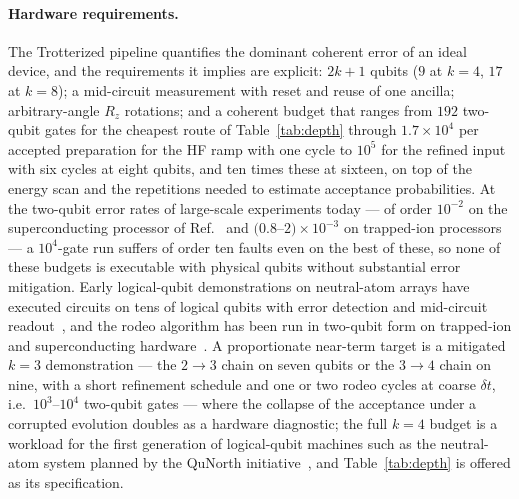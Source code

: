 \documentclass[
  aps,            %
  prc,            %
  reprint,        %
  superscriptaddress,
  floatfix,
  nofootinbib
]{revtex4-2}
\begin{document}
\paragraph{Hardware requirements.}
The Trotterized pipeline quantifies the dominant coherent error of an ideal
device, and the requirements it implies are explicit: $2k+1$ qubits ($9$ at
$k=4$, $17$ at $k=8$); a mid-circuit measurement with reset and reuse of one
ancilla; arbitrary-angle $R_z$ rotations; and a coherent budget that ranges
from $192$ two-qubit gates for the cheapest route of Table~\ref{tab:depth}
through $1.7\times10^{4}$ per accepted preparation for the HF ramp with one
cycle to $10^{5}$ for the refined input with six cycles at eight qubits,
and ten times these at sixteen, on top of the energy scan and the
repetitions needed to estimate acceptance probabilities.  At the two-qubit
error rates of large-scale experiments today --- of order $10^{-2}$ on the
superconducting processor of Ref.~\cite{Kim2023} and $(0.8$--$2)\times10^{-3}$
on trapped-ion processors~\cite{Moses2023,Ransford2025} --- a $10^{4}$-gate
run suffers of order ten faults even on the best of these, so none of
these budgets is executable with physical qubits without substantial error
mitigation.  Early logical-qubit demonstrations on neutral-atom arrays have
executed circuits on tens of logical qubits with error detection and
mid-circuit readout~\cite{Bluvstein2024,Reichardt2024}, and the rodeo
algorithm has been run in two-qubit form on trapped-ion and superconducting
hardware~\cite{BeeLindgren2022,Qian2024}.  A proportionate near-term target
is a mitigated $k=3$ demonstration --- the $2\to3$ chain on seven qubits or
the $3\to4$ chain on nine, with a short refinement schedule and one or two
rodeo cycles at coarse $\delta t$, i.e.\ $10^{3}$--$10^{4}$ two-qubit gates
--- where the collapse of the acceptance under a corrupted evolution doubles
as a hardware diagnostic; the full $k=4$ budget is a workload for the first
generation of logical-qubit machines such as the neutral-atom system planned
by the QuNorth initiative~\cite{QuNorth}, and Table~\ref{tab:depth} is
offered as its specification.
\end{document}

